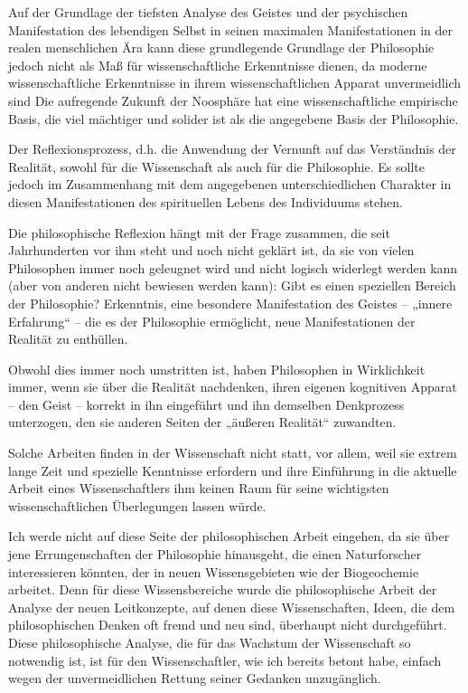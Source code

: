 \documentclass[11pt,a4paper]{book}
\begin{document}
Auf der Grundlage der tiefsten Analyse des Geistes und der psychischen Manifestation des lebendigen Selbst in seinen maximalen Manifestationen in der realen menschlichen Ära kann diese grundlegende Grundlage der Philosophie jedoch nicht als Maß für wissenschaftliche Erkenntnisse dienen, da moderne wissenschaftliche Erkenntnisse in ihrem wissenschaftlichen Apparat unvermeidlich sind Die aufregende Zukunft der Noosphäre hat eine wissenschaftliche empirische Basis, die viel mächtiger und solider ist als die angegebene Basis der Philosophie.



Der Reflexionsprozess, d.h. die Anwendung der Vernunft auf das Verständnis der Realität, sowohl für die Wissenschaft als auch für die Philosophie. Es sollte jedoch im Zusammenhang mit dem angegebenen unterschiedlichen Charakter in diesen Manifestationen des spirituellen Lebens des Individuums stehen.



Die philosophische Reflexion hängt mit der Frage zusammen, die seit Jahrhunderten vor ihm steht und noch nicht geklärt ist, da sie von vielen Philosophen immer noch geleugnet wird und nicht logisch widerlegt werden kann (aber von anderen nicht bewiesen werden kann): Gibt es einen speziellen Bereich der Philosophie? Erkenntnis, eine besondere Manifestation des Geistes -- „innere Erfahrung“ -- die es der Philosophie ermöglicht, neue Manifestationen der Realität zu enthüllen.



Obwohl dies immer noch umstritten ist, haben Philosophen in Wirklichkeit immer, wenn sie über die Realität nachdenken, ihren eigenen kognitiven Apparat -- den Geist -- korrekt in ihn eingeführt und ihn demselben Denkprozess unterzogen, den sie anderen Seiten der „äußeren Realität“ zuwandten.



Solche Arbeiten finden in der Wissenschaft nicht statt, vor allem, weil sie extrem lange Zeit und spezielle Kenntnisse erfordern und ihre Einführung in die aktuelle Arbeit eines Wissenschaftlers ihm keinen Raum für seine wichtigsten wissenschaftlichen Überlegungen lassen würde.



Ich werde nicht auf diese Seite der philosophischen Arbeit eingehen, da sie über jene Errungenschaften der Philosophie hinausgeht, die einen Naturforscher interessieren könnten, der in neuen Wissensgebieten wie der Biogeochemie arbeitet. Denn für diese Wissensbereiche wurde die philosophische Arbeit der Analyse der neuen Leitkonzepte, auf denen diese Wissenschaften, Ideen, die dem philosophischen Denken oft fremd und neu sind, überhaupt nicht durchgeführt. Diese philosophische Analyse, die für das Wachstum der Wissenschaft so notwendig ist, ist für den Wissenschaftler, wie ich bereits betont habe, einfach wegen der unvermeidlichen Rettung seiner Gedanken unzugänglich.
\end{document}
